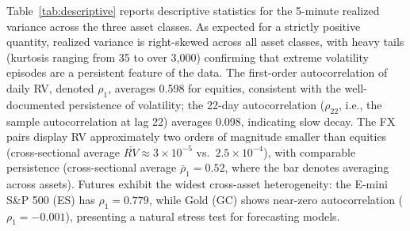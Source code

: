 \documentclass[12pt]{article}
\begin{document}
Table~\ref{tab:descriptive} reports descriptive statistics for the 5-minute realized variance across the three asset classes. As expected for a strictly positive quantity, realized variance is right-skewed across all asset classes, with heavy tails (kurtosis ranging from 35 to over 3,000) confirming that extreme volatility episodes are a persistent feature of the data. The first-order autocorrelation of daily RV, denoted $\rho_1$, averages 0.598 for equities, consistent with the well-documented persistence of volatility; the 22-day autocorrelation ($\rho_{22}$, i.e., the sample autocorrelation at lag 22) averages 0.098, indicating slow decay. The FX pairs display RV approximately two orders of magnitude smaller than equities (cross-sectional average $\bar{RV} \approx 3 \times 10^{-5}$ vs.\ $2.5 \times 10^{-4}$), with comparable persistence (cross-sectional average $\bar{\rho}_1 = 0.52$, where the bar denotes averaging across assets). Futures exhibit the widest cross-asset heterogeneity: the E-mini S\&P 500 (ES) has $\rho_1 = 0.779$, while Gold (GC) shows near-zero autocorrelation ($\rho_1 = -0.001$), presenting a natural stress test for forecasting models.
\end{document}
